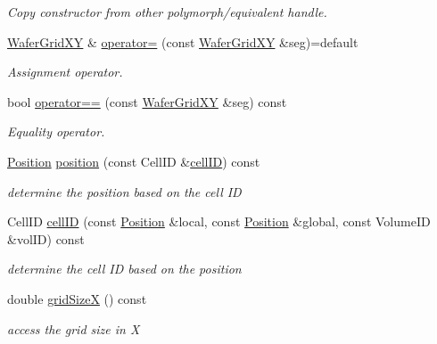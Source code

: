 \begin{DoxyCompactItemize}
\begin{DoxyCompactList}\small\item\em Copy constructor from other polymorph/equivalent handle. \end{DoxyCompactList}\item 
\hyperlink{class_d_d4hep_1_1_geometry_1_1_wafer_grid_x_y}{Wafer\+Grid\+XY} \& \hyperlink{class_d_d4hep_1_1_geometry_1_1_wafer_grid_x_y_a628ab65311ab225b0ca4f39fe8e161e6}{operator=} (const \hyperlink{class_d_d4hep_1_1_geometry_1_1_wafer_grid_x_y}{Wafer\+Grid\+XY} \&seg)=default
\begin{DoxyCompactList}\small\item\em Assignment operator. \end{DoxyCompactList}\item 
bool \hyperlink{class_d_d4hep_1_1_geometry_1_1_wafer_grid_x_y_aa0c5e177c3e8a2c17d4800ab3bfc1d59}{operator==} (const \hyperlink{class_d_d4hep_1_1_geometry_1_1_wafer_grid_x_y}{Wafer\+Grid\+XY} \&seg) const
\begin{DoxyCompactList}\small\item\em Equality operator. \end{DoxyCompactList}\item 
\hyperlink{namespace_d_d4hep_1_1_geometry_a55083902099d03506c6db01b80404900}{Position} \hyperlink{class_d_d4hep_1_1_geometry_1_1_wafer_grid_x_y_acfb0951547a5ed2e4b909c52dc867967}{position} (const Cell\+ID \&\hyperlink{class_d_d4hep_1_1_geometry_1_1_wafer_grid_x_y_a76a056c88d1711ba099c220db7e54a98}{cell\+ID}) const
\begin{DoxyCompactList}\small\item\em determine the position based on the cell ID \end{DoxyCompactList}\item 
Cell\+ID \hyperlink{class_d_d4hep_1_1_geometry_1_1_wafer_grid_x_y_a76a056c88d1711ba099c220db7e54a98}{cell\+ID} (const \hyperlink{namespace_d_d4hep_1_1_geometry_a55083902099d03506c6db01b80404900}{Position} \&local, const \hyperlink{namespace_d_d4hep_1_1_geometry_a55083902099d03506c6db01b80404900}{Position} \&global, const Volume\+ID \&vol\+ID) const
\begin{DoxyCompactList}\small\item\em determine the cell ID based on the position \end{DoxyCompactList}\item 
double \hyperlink{class_d_d4hep_1_1_geometry_1_1_wafer_grid_x_y_a5a5b9f5a36decd58ed029469d8b503ac}{grid\+SizeX} () const
\begin{DoxyCompactList}\small\item\em access the grid size in X \end{DoxyCompactList}\item 

\end{DoxyCompactItemize}
